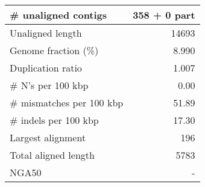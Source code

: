 \documentclass[12pt,a4paper]{article}
\begin{document}
\begin{table}[ht]
\begin{center}
\begin{tabular}{|l*{1}{|r}|}
\# unaligned contigs & 358 + 0 part \\ \hline
Unaligned length & 14693 \\ \hline
Genome fraction (\%) & 8.990 \\ \hline
Duplication ratio & 1.007 \\ \hline
\# N's per 100 kbp & 0.00 \\ \hline
\# mismatches per 100 kbp & 51.89 \\ \hline
\# indels per 100 kbp & 17.30 \\ \hline
Largest alignment & 196 \\ \hline
Total aligned length & 5783 \\ \hline
NGA50 & - \\ \hline
\end{tabular}
\end{center}
\end{table}
\end{document}
